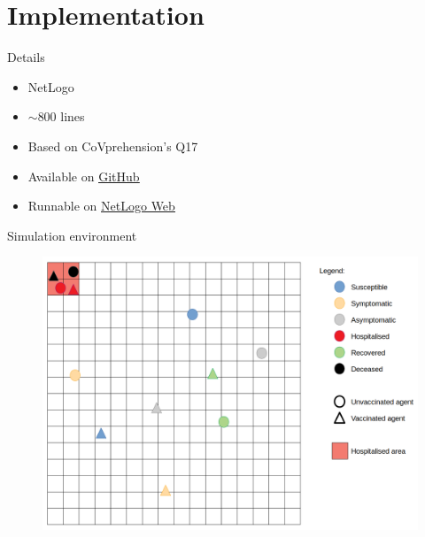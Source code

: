 \documentclass{beamer}
\begin{document}
\section{Implementation}

\begin{frame}{Details}
    \begin{itemize}
        \item NetLogo
        \item $\sim$800 lines
        \item Based on CoVprehension's Q17
        \item Available on \href{https://github.com/CalvinMT/TrustVaccSim}{\ul{GitHub}}
        \item Runnable on \href{https://www.netlogoweb.org/launch\#https://raw.githubusercontent.com/CalvinMT/TrustVaccSim/main/src/trustvaccsim.nlogo}{\ul{NetLogo Web}}
    \end{itemize}
\end{frame}

\begin{frame}{Simulation environment}
    \begin{figure}
        \begin{center}
            \includegraphics[width=0.8\linewidth]{fig/simulation_figure.png}
        \end{center}
    \end{figure}
\end{frame}
\end{document}
